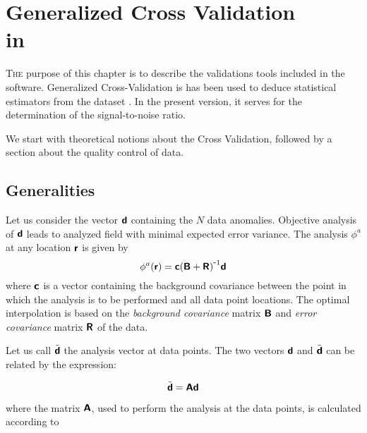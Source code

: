 \chapter[Generalized Cross Validation]{Generalized Cross Validation\\ 
  in \diva \label{gcv}}

\lettrine[lines=2, loversize=-0.1, lraise=0.1]{T}{he} purpose of this chapter is to describe the validations tools included in the \diva\, software.  Generalized Cross-Validation is has been used to deduce statistical estimators from the dataset \citep{BRANKART96}. In the present version, it serves for the determination of the signal-to-noise ratio.

We start with theoretical notions about the Cross Validation, followed by a section about the quality control of data. 

\minitoc


\section{Generalities}

Let us consider the vector $\mbox{\boldmath $ \protect\mathsf{d} $}$ containing the $N$ data anomalies. Objective analysis of $\mbox{\boldmath $ \protect\mathsf{d} $}$ leads to analyzed field with minimal expected error variance. The analysis $\phi^a$ at any location $\mbox{\boldmath $ \protect\mathsf{r} $}$ is given by
\begin{equation}
\phi^a(\mbox{\boldmath $ \protect\mathsf{r} $}) = \mbox{\boldmath $ \protect\mathsf{c} $} {( \mbox{\boldmath $ \protect\mathsf{B} $} + \mbox{\boldmath $ \protect\mathsf{R} $} )}^{ \mbox{\small{-}} 1} \mbox{\boldmath $ \protect\mathsf{d} $}
\end{equation}
where $\mbox{\boldmath $ \protect\mathsf{c} $}$ is a vector containing the background covariance between the point in which the analysis is to be performed and all data point locations. The optimal interpolation is based on the \textit{background covariance} matrix $\mbox{\boldmath $ \protect\mathsf{B} $}$ and \textit{error covariance} matrix $\mbox{\boldmath $ \protect\mathsf{R} $}$ of the data.
 
Let us call $\tilde{\mbox{\boldmath $ \protect\mathsf{d} $}}$ the analysis vector at data points. The two vectors ${\mbox{\boldmath $ \protect\mathsf{d} $}}$ and $\tilde{\mbox{\boldmath $ \protect\mathsf{d} $}}$ can be related by the expression:

\begin{equation}
\tilde{\mbox{\boldmath $ \protect\mathsf{d} $}}  =  \mbox{\boldmath $ \protect\mathsf{A} $} \mbox{\boldmath $ \protect\mathsf{d} $}
\end{equation}

where the matrix $\mbox{\boldmath $ \protect\mathsf{A} $}$, used to perform the analysis at the data points, is calculated according to 

